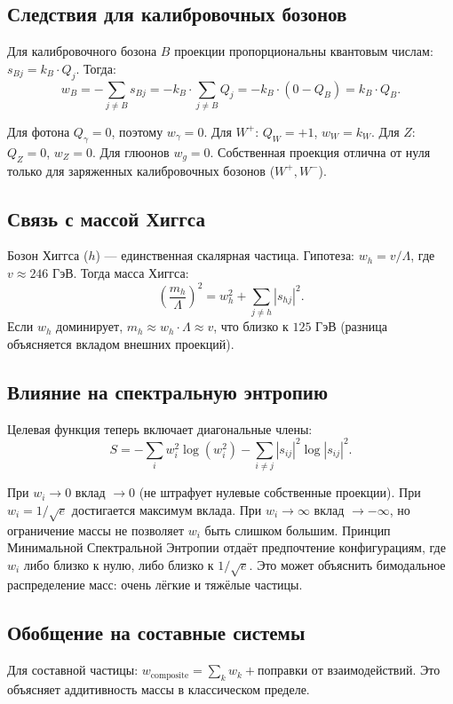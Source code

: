 \documentclass[12pt,a4paper]{article}
\begin{document}
\subsection{Следствия для калибровочных бозонов}
Для калибровочного бозона $B$ проекции пропорциональны квантовым числам: $s_{Bj} = k_B \cdot Q_j$. Тогда:
\begin{equation}
    w_B = -\sum_{j \neq B} s_{Bj} = -k_B \cdot \sum_{j \neq B} Q_j = -k_B \cdot (0 - Q_B) = k_B \cdot Q_B.
\end{equation}

Для фотона $Q_\gamma = 0$, поэтому $w_\gamma = 0$. Для $W^+$: $Q_W = +1$, $w_W = k_W$. Для $Z$: $Q_Z = 0$, $w_Z = 0$. Для глюонов $w_g = 0$. Собственная проекция отлична от нуля только для заряженных калибровочных бозонов ($W^+, W^-$).

\subsection{Связь с массой Хиггса}
Бозон Хиггса ($h$) --- единственная скалярная частица. Гипотеза: $w_h = v / \Lambda$, где $v \approx 246$ ГэВ. Тогда масса Хиггса:
\begin{equation}
    \left( \frac{m_h}{\Lambda} \right)^2 = w_h^2 + \sum_{j \neq h} |s_{hj}|^2.
\end{equation}
Если $w_h$ доминирует, $m_h \approx w_h \cdot \Lambda \approx v$, что близко к $125$ ГэВ (разница объясняется вкладом внешних проекций).

\subsection{Влияние на спектральную энтропию}
Целевая функция теперь включает диагональные члены:
\begin{equation}
    S = -\sum_i w_i^2 \log(w_i^2) - \sum_{i \neq j} |s_{ij}|^2 \log|s_{ij}|^2.
\end{equation}

При $w_i \to 0$ вклад $\to 0$ (не штрафует нулевые собственные проекции). При $w_i = 1/\sqrt{e}$ достигается максимум вклада. При $w_i \to \infty$ вклад $\to -\infty$, но ограничение массы не позволяет $w_i$ быть слишком большим. Принцип Минимальной Спектральной Энтропии отдаёт предпочтение конфигурациям, где $w_i$ либо близко к нулю, либо близко к $1/\sqrt{e}$. Это может объяснить бимодальное распределение масс: очень лёгкие и тяжёлые частицы.

\subsection{Обобщение на составные системы}
Для составной частицы: $w_{\text{composite}} = \sum_{k} w_k + \text{поправки от взаимодействий}$. Это объясняет аддитивность массы в классическом пределе.
\end{document}

